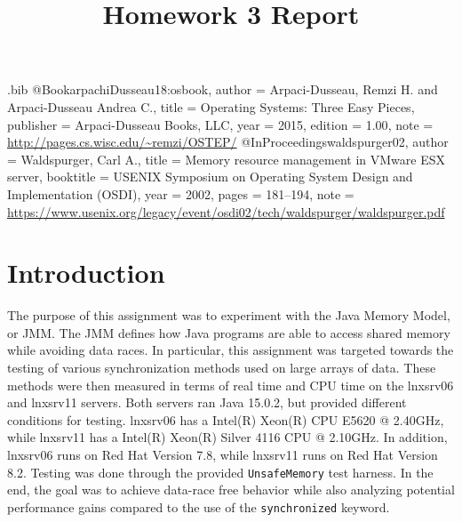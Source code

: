 \usepackage{filecontents}

\begin{filecontents}{\jobname.bib}
@Book{arpachiDusseau18:osbook,
  author =       {Arpaci-Dusseau, Remzi H. and Arpaci-Dusseau Andrea C.},
  title =        {Operating Systems: Three Easy Pieces},
  publisher =    {Arpaci-Dusseau Books, LLC},
  year =         2015,
  edition =      {1.00},
  note =         {\url{http://pages.cs.wisc.edu/~remzi/OSTEP/}}
}
@InProceedings{waldspurger02,
  author =       {Waldspurger, Carl A.},
  title =        {Memory resource management in {VMware ESX} server},
  booktitle =    {USENIX Symposium on Operating System Design and
                  Implementation (OSDI)},
  year =         2002,
  pages =        {181--194},
  note =         {\url{https://www.usenix.org/legacy/event/osdi02/tech/waldspurger/waldspurger.pdf}}}
\end{filecontents}



\date{}

\title{\Large \bf Homework 3 Report}

\maketitle

\section{Introduction}

The purpose of this assignment was to experiment with the Java Memory Model, or
JMM. The JMM defines how Java programs are able to access shared memory while
avoiding data races. In particular, this assignment was targeted towards the
testing of various synchronization methods used on large arrays of data. These
methods were then measured in terms of real time and CPU time on the lnxsrv06 
and lnxsrv11 servers. Both servers ran Java 15.0.2, but provided different
conditions for testing. lnxsrv06 has a Intel(R) Xeon(R) CPU E5620 @ 2.40GHz,
while lnxsrv11 has a Intel(R) Xeon(R) Silver 4116 CPU @ 2.10GHz. In addition,
lnxsrv06 runs on Red Hat Version 7.8, while lnxsrv11 runs on Red Hat Version 8.2.
Testing was done through the provided \texttt{UnsafeMemory} test harness. In the end, the goal was to achieve
data-race free behavior
while also analyzing potential performance gains compared to the use of the
\texttt{synchronized} keyword.

